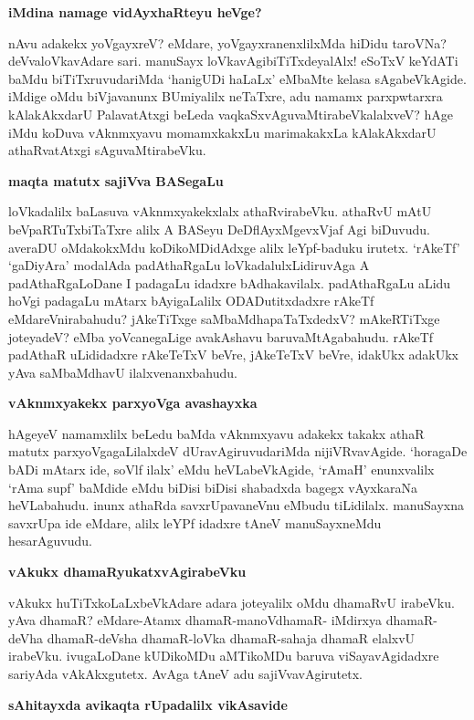 {\bigskip
\noindent
{\large\bf iMdina namage vidAyxhaRteyu heVge?}}\label{page109}
\medskip

\noindent
nAvu adakekx yoVgayxreV? eMdare, yoVgayxranenxlilxMda hiDidu taroVNa? 
deVvaloVkavAdare sari. manuSayx loVkavAgibiTiTxdeyalAlx! eSoTxV keYdATi baMdu biTiTxruvudariMda `hanigUDi haLaLx' eMbaMte kelasa sAgabeVkAgide. iMdige oMdu biVjavanunx BUmiyalilx neTaTxre, adu namamx parxpwtarxra kAlakAkx\-darU PalavatAtxgi beLeda vaqkaSxvAguvaMtirabeVkalalxveV? hAge iMdu koDuva vAknmxyavu momamxkakxLu mari\-makakxLa kAlakAkxdarU athaRvatAtxgi sAguvaMtirabeVku.

{\bigskip
\noindent
{\large\bf maqta matutx sajiVva BASegaLu}}\label{page109}
\medskip

\noindent
loVkadalilx baLasuva vAknmxyakekxlalx athaRvirabeVku. athaRvU mAtU 
beVpaRTuTxbiTaTxre alilx A BASeyu DeDflAyxMgevxVjaf Agi biDuvudu. 
averaDU oMdakokxMdu koDikoMDidAdxge alilx leYpf-\-baduku irutetx. `rAkeTf' `gaDiyAra' modalAda padAthaRgaLu loVkadalulxLidiruvAga A padAthaR\-gaLoDane I pada\-gaLu idadxre bAdhakavilalx. padAthaRgaLu aLidu hoVgi padagaLu mAtarx bAyigaLalilx ODADutitxdadxre rAkeTf eMdareVnirabahudu? jAkeTiTxge saMbaMdhapaTaTxdedxV? mAkeRTiTxge joteyadeV? eMba yoVcanegaLige avakAshavu baruvaMtAgabahudu. rAkeTf padAthaR uLididadxre rAkeTeTxV beVre, jAkeTeTxV beVre, idakUkx adakUkx yAva saMbaMdhavU ilalxvenanxbahudu.

{\bigskip
\noindent
{\large\bf vAknmxyakekx parxyoVga avashayxka}}\label{page110}
\medskip

\noindent
hAgeyeV namamxlilx beLedu baMda vAknmxyavu adakekx takakx athaR matutx parxyoVgagaLilalxdeV dUravAgiru\-vudariMda nijiVRvavAgide. `horagaDe bADi mAtarx ide, soVlf ilalx' eMdu heVLabeVkAgide, `rAmaH' enunxvalilx `rAma supf' baMdide eMdu biDisi biDisi shabadxda bagegx vAyxkaraNa heVLabahudu. inunx\- athaRda savxrUpavaneVnu eMbudu tiLidilalx. manuSayxna savxrUpa ide eMdare, alilx leYPf idadxre tAneV manuSayx\-neMdu hesarAguvudu.

{\bigskip
\noindent
{\large\bf vAkukx dhamaRyukatxvAgirabeVku}}\label{page110}
\medskip

\noindent
vAkukx huTiTxkoLaLxbeVkAdare adara joteyalilx oMdu dhamaRvU irabeVku. 
yAva dhamaR? eMdare\--Atamx dhamaR-manoVdhamaR- 
iMdirxya dhamaR-deVha dhamaR-\-deVsha dhamaR-loVka dhamaR-sahaja dhamaR elalxvU irabeVku. ivugaLoDane kUDikoMDu aMTikoMDu baruva viSayavAgidadxre sari\-yAda vAkAkxgutetx. AvAga tAneV adu sajiVvavAgirutetx. 

{\bigskip
\noindent
{\large\bf sAhitayxda avikaqta rUpadalilx vikAsavide}}\label{page110}
\medskip


